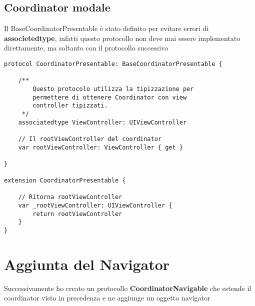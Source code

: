 \subsection{Coordinator modale}

Il BaseCoordinatorPresentable è stato definito per evitare errori di \textbf{associetedtype},
infatti questo protocollo non deve mai essere implementato direttamente, ma soltanto con il protocollo successivo

\begin{verbatim}
protocol CoordinatorPresentable: BaseCoordinatorPresentable {

    /**
        Questo protocolo utilizza la tipizzazione per
        permettere di ottenere Coordinator con view
        controller tipizzati.
     */
    associatedtype ViewController: UIViewController

    // Il rootViewController del coordinator
    var rootViewController: ViewController { get }

}

extension CoordinatorPresentable {

    // Ritorna rootViewController
    var _rootViewController: UIViewController {
        return rootViewController
    }
}
\end{verbatim}

\section{Aggiunta del Navigator}

Successivamente ho creato un protocollo \textbf{CoordinatorNavigable} che estende 
il coordinator visto in precedenza e ne aggiunge un oggetto navigator


